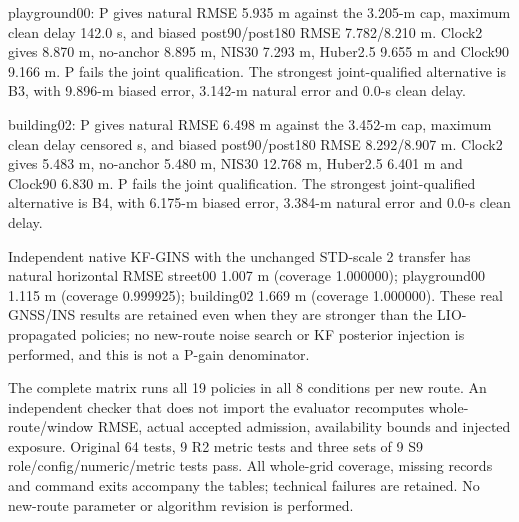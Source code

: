 \documentclass[conference]{IEEEtran}
\begin{document}
playground00: P gives natural RMSE 5.935 m against the 3.205-m cap, maximum clean delay 142.0 s, and biased post90/post180 RMSE 7.782/8.210 m. Clock2 gives 8.870 m, no-anchor 8.895 m, NIS30 7.293 m, Huber2.5 9.655 m and Clock90 9.166 m. P fails the joint qualification. The strongest joint-qualified alternative is B3, with 9.896-m biased error, 3.142-m natural error and 0.0-s clean delay.

building02: P gives natural RMSE 6.498 m against the 3.452-m cap, maximum clean delay censored s, and biased post90/post180 RMSE 8.292/8.907 m. Clock2 gives 5.483 m, no-anchor 5.480 m, NIS30 12.768 m, Huber2.5 6.401 m and Clock90 6.830 m. P fails the joint qualification. The strongest joint-qualified alternative is B4, with 6.175-m biased error, 3.384-m natural error and 0.0-s clean delay.

Independent native KF-GINS with the unchanged STD-scale 2 transfer has natural horizontal RMSE street00 1.007 m (coverage 1.000000); playground00 1.115 m (coverage 0.999925); building02 1.669 m (coverage 1.000000). These real GNSS/INS results are retained even when they are stronger than the LIO-propagated policies; no new-route noise search or KF posterior injection is performed, and this is not a P-gain denominator.

The complete matrix runs all 19 policies in all 8 conditions per new route. An independent checker that does not import the evaluator recomputes whole-route/window RMSE, actual accepted admission, availability bounds and injected exposure. Original 64 tests, 9 R2 metric tests and three sets of 9 S9 role/config/numeric/metric tests pass. All whole-grid coverage, missing records and command exits accompany the tables; technical failures are retained. No new-route parameter or algorithm revision is performed.
\end{document}
